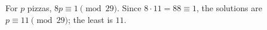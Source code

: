 For $p$ pizzas, $8p\equiv1\pmod{29}$. Since $8\cdot11=88\equiv1$, the solutions are $p\equiv11\pmod{29}$; the least is $\boxed{11}$.
